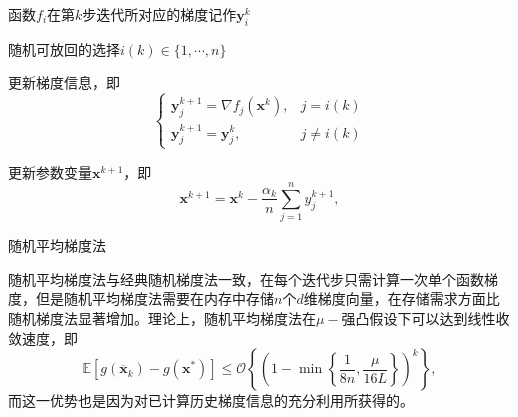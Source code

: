 \begin{algorithm}
    \SetAlgoLined
     {
        函数$f_{i}$在第$k$步迭代所对应的梯度记作$\bm{y}_{i}^{k}$

        随机可放回的选择$i(k) \in\{1, \cdots, n\}$
        
        更新梯度信息，即
            \begin{equation}
                \left\{\begin{array}{ll}
                \bm{y}_{j}^{k+1}=\nabla f_{j}\left(\bm{x}^{k}\right), & j=i(k) \\
                \bm{y}_{j}^{k+1}=\bm{y}_{j}^{k}, & j \neq i(k)
                \end{array}\right.
                \nonumber
            \end{equation}
            
        更新参数变量$\bm{x}^{k+1}$，即
            \begin{equation}
                \bm{x}^{k+1}=\bm{x}^{k}-\frac{\alpha_{k}}{n} \sum_{j=1}^{n} y_{j}^{k+1} ,
                \nonumber
            \end{equation}
    }
    \caption{随机平均梯度法}
    \label{alg6_1}
\end{algorithm}

\par 随机平均梯度法与经典随机梯度法一致，在每个迭代步只需计算一次单个函数梯度，但是随机平均梯度法需要在内存中存储$n$个$d$维梯度向量，在存储需求方面比随机梯度法显著增加。理论上，随机平均梯度法在$\mu-$强凸假设下可以达到线性收敛速度，即
\begin{equation}
    \mathbb{E}\left[g\left(\overline{\bm{x}}_{k}\right)-g\left(\bm{x}^{*}\right)\right] \leq \mathcal{O}\left\{\left(1-\min \left\{\frac{1}{8 n}, \frac{\mu}{16 L}\right\}\right)^{k}\right\} ,
    \nonumber
\end{equation}
而这一优势也是因为对已计算历史梯度信息的充分利用所获得的\cite{SAG}。

